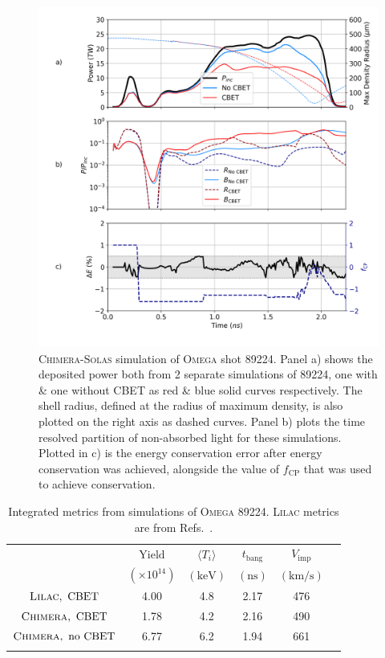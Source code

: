 \begin{figure}[t!]
    \includegraphics[width=0.9\linewidth]{Numerics/Images/89224_absorption.png}
    \centering
    \caption{\textsc{Chimera}-\textsc{Solas} simulation of \textsc{Omega} shot 89224.
    Panel a) shows the deposited power both from 2 separate simulations of 89224, one with \& one without \ac{CBET} as red \& blue solid curves respectively.
    The shell radius, defined at the radius of maximum density, is also plotted on the right axis as dashed curves.
    Panel b) plots the time resolved partition of non-absorbed light for these simulations.
    Plotted in c) is the energy conservation error after energy conservation was achieved, alongside the value of $f_{\text{CP}}$ that was used to achieve conservation.}%
    \label{fig:SOLAS_89224}
\end{figure}

\begin{table}[ht]
    \centering
    \caption{Integrated metrics from simulations of \textsc{Omega} 89224. \textsc{Lilac} metrics are from Refs.~\cite{patel_novel_2018,cao_interpreting_2019,crilly_neutron_2020}.}
    \begin{tabular}{cccccc} \hhline{=====}
    & $\text{Yield}$ & $\langle T_i \rangle$ & $t_{\text{bang}}$ & $V_{\text{imp}}$ \\ 
    & $\left(\times10^{14}\right)$ & $(\text{keV})$ & $(\text{ns})$ & $(\text{km/s})$ \\ 
    \hhline{-----}
    $\textsc{Lilac},\ \text{CBET}$ & 4.00 & 4.8 & 2.17 & 476  \\
    $\textsc{Chimera},\ \text{CBET}$ & 1.78 & 4.2 & 2.16 & 490  \\
    $\textsc{Chimera},\ \text{no CBET}$ & 6.77 & 6.2 & 1.94 & 661 \\ \hhline{======}
    \end{tabular}%
    \label{tab:SOLAS_89224_metrics}
\end{table}

